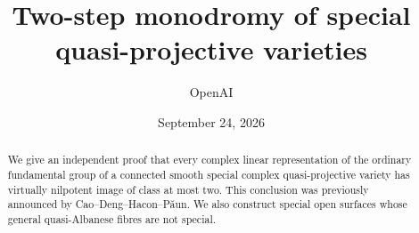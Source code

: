 \documentclass[11pt]{article}
\title{Two-step monodromy of special\protect\\ quasi-projective varieties}
\author{OpenAI}
\date{September 24, 2026}
\numberwithin{equation}{section}
\theoremstyle{definition}
\theoremstyle{remark}
\begin{document}
\maketitle
\begin{abstract}
We give an independent proof that every complex linear representation
of the ordinary fundamental group of a connected smooth special complex
quasi-projective variety has virtually nilpotent image of class at most
two. This conclusion was previously announced by
Cao--Deng--Hacon--P\u aun. We also construct special open surfaces whose
general quasi-Albanese fibres are not special.
\end{abstract}










\begingroup
\small


\endgroup
\end{document}
